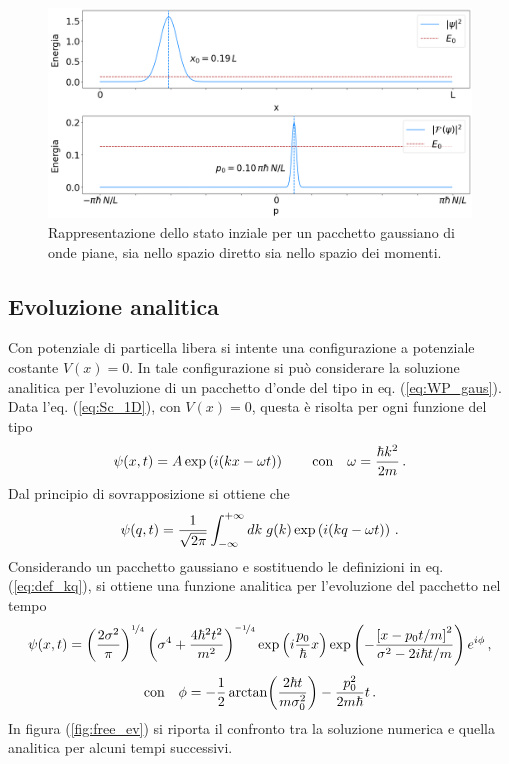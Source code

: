 \begin{figure}
    \centering
    \includegraphics[width = \textwidth]{immagini/free_p_view.png}
    \caption{Rappresentazione dello stato inziale per un pacchetto gaussiano di onde piane, sia nello spazio diretto sia nello spazio dei momenti.}
    \label{fig:free_p_view}
\end{figure}

\subsection{Evoluzione analitica}

Con potenziale di particella libera si intente una configurazione a potenziale costante $V(x) = 0$. In tale configurazione si può considerare la soluzione analitica per l'evoluzione di un pacchetto d'onde del tipo in eq. (\ref{eq:WP_gaus}). 
Data l'eq. (\ref{eq:Sc_1D}), con $V(x) = 0$, questa è risolta per ogni funzione del tipo
\begin{equation}
    \centering
    \psi(x, t) = A \exp \left(i(kx - \omega t)\right) \qquad \text{con}  \quad \omega = \frac{\hbar k^2}{2m} \, \text{.}
    \label{eq:plane_wave}
\end{equation}
Dal principio di sovrapposizione si ottiene che
\begin{equation}
    \centering
    \psi(q,t) = \frac{1}{\sqrt{2 \pi}} \int_{- \infty}^{+ \infty} dk \; g(k) \exp \left(i(kq - \omega t)\right) \, \text{.}
    \label{eq:WP_ev}
\end{equation}
Considerando un pacchetto gaussiano e sostituendo le definizioni in eq. (\ref{eq:def_kq}), si ottiene una funzione analitica per l'evoluzione del pacchetto nel tempo \cite{CT:QM}
\begin{equation}
    \centering
    \psi(x,t) = 
    \left( \frac{2 \sigma^2}{\pi} \right)^{\nicefrac{1}{4}} 
    \left( \sigma^4 + \frac{4 \hbar^2 t^2}{m^2}   \right)^{\nicefrac{-1}{4}}
    \exp \left(i \frac{p_0}{\hbar} x\right) 
    \exp \left( - \frac{\left[ x - p_0 t / m \right]^{2}} {\sigma^2 - 2 i \hbar t / m} \right)
    e^{i \phi} \, \text{,}
    \label{eq:WP_gaus_ev}
\end{equation}
\begin{equation}
    \centering
    \text{con} \quad \phi = - \frac{1}{2} \arctan (\frac{2 \hbar t}{m \sigma_0^2}) - \frac{p_0^2}{2 m \hbar} t  \, \text{.}
\end{equation}
In figura (\ref{fig:free_ev}) si riporta il confronto tra la soluzione numerica e quella analitica per alcuni tempi successivi.

